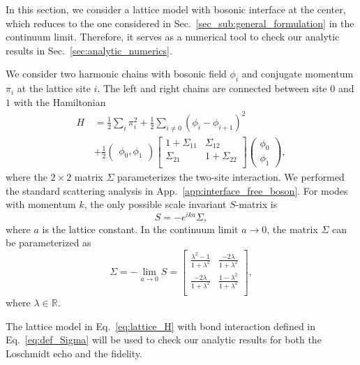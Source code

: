 
In this section, we consider a lattice model with bosonic interface at the center\cite{peschel_exact_2012,calabrese_entanglement_2012}, which reduces to the one considered in Sec.~\ref{sec_sub:general_formulation} in the continuum limit\cite{sakai_entanglement_2008}. Therefore, it serves as a numerical tool to check our analytic results in Sec.~\ref{sec:analytic_numerics}. 


We consider two harmonic chains with bosonic field $\phi_i$ and conjugate momentum $\pi_i$ at the lattice site $i$. The left and right chains are connected between site $0$ and $1$ with the Hamiltonian
\begin{equation}
\begin{aligned}
\label{eq:lattice_H}
H &= \frac{1}{2} \sum_i \pi_i^2  +  \frac{1}{2} \sum_{i\ne 0 }  ( \phi_i - \phi_{i+1} )^2 \\
\quad & + \frac{1}{2} \begin{pmatrix}  \phi_0, \phi_1 \end{pmatrix}
\begin{bmatrix}
1 + \Sigma_{11}  & \Sigma_{12} \\
\Sigma_{21} &  1 + \Sigma_{22} \\
\end{bmatrix}
\begin{pmatrix}
\phi_0 \\
\phi_1 
\end{pmatrix},
\end{aligned}
\end{equation}
where the $2\times2$ matrix $\Sigma$ parameterizes the two-site interaction. We performed the standard scattering analysis in App.~\ref{app:interface_free_boson}. For modes with momentum $k$, the only possible scale invariant $S$-matrix is
\begin{equation}
S = - e^{ika} \Sigma,
\end{equation}
where $a$ is the lattice constant. In the continuum limit $a\rightarrow0$, the matrix $\Sigma$ can be parameterized as
\begin{equation}
\label{eq:def_Sigma}
\Sigma = -\lim_{a \rightarrow 0 } S = 
\begin{bmatrix}
\frac{\lambda^2- 1}{1 + \lambda^2} & \frac{-2\lambda }{1 + \lambda^2} \\
\frac{-2\lambda }{1 + \lambda^2} & \frac{1- \lambda^2}{1 + \lambda^2} \\
\end{bmatrix},
\end{equation}
where $\lambda\in\mathbb{R}$. 

The lattice model in Eq.~\eqref{eq:lattice_H} with bond interaction defined in Eq.~\eqref{eq:def_Sigma} will be used to check our analytic results for both the Loschmidt echo and the fidelity.



